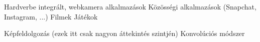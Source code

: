 


Hardverbe integrált, webkamera alkalmazások
Közösségi alkalmazások (Snapchat, Instagram, ...)
Filmek
Játékok


Képfeldolgozás (ezek itt csak nagyon áttekintés szintjén)
Konvolúciós módszer




